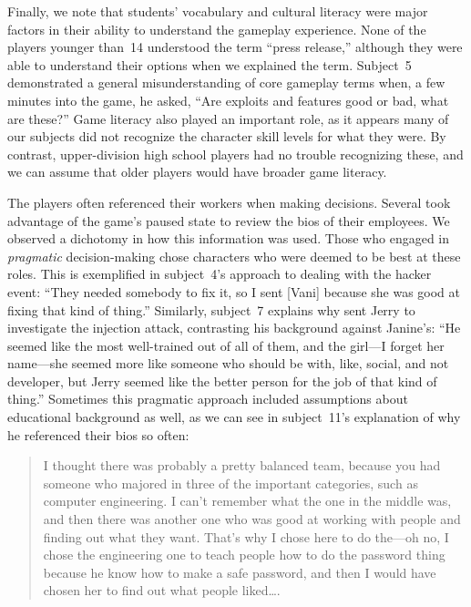 \documentclass[letterpaper]{article}
\begin{document}
Finally, we note that students' vocabulary and cultural literacy
were major factors in their ability to understand the gameplay
experience.
None of the players younger than~14 understood the term ``press release,''
although they were able to understand their options when we explained
the term.
Subject~5 demonstrated a general misunderstanding of core
gameplay terms when, a few minutes into the game, he asked,
``Are exploits and features good or bad, what are these?''
Game literacy also played an important role, as it appears many of
our subjects did not recognize the character skill levels for what they were.
By contrast, upper-division high school players had no trouble recognizing
these, and we can assume that older players would have broader game literacy.



The players often referenced their workers when making decisions. Several
took advantage of the game's paused state to review the bios of their
employees. We observed a dichotomy in how this information was used.
Those who engaged in \textit{pragmatic} decision-making chose
characters who were deemed to be best at these roles. This is exemplified
in subject~4's approach to dealing with the hacker event:
``They needed somebody to fix it, so
I sent [Vani] because she was good at fixing that kind
of thing.'' Similarly, subject~7 explains why sent Jerry to investigate
the injection attack, contrasting his background against Janine's:
``He seemed like the most well-trained out of all of them,
and the girl---I forget her name---she seemed more like someone
who should be with, like, social, and not developer,
but Jerry seemed like the better person for the job of that kind of thing.''
Sometimes this pragmatic approach included assumptions about 
educational background as well, as we can see in subject~11's 
explanation of why he referenced their bios so often:
\begin{quote}
I thought there was probably a pretty balanced team, because you had
someone who majored in three of the important categories,
such as computer engineering.
I can't remember what the one in the middle was, and
then there was another one who was good at working with people and
finding out what they want. That's why I chose here to do the---oh no,
I chose the engineering one to teach people how to do the password thing because
he know how to make a safe password, and then I would have chosen her to
find out what people liked\ldots{}.
\end{quote}
\end{document}
